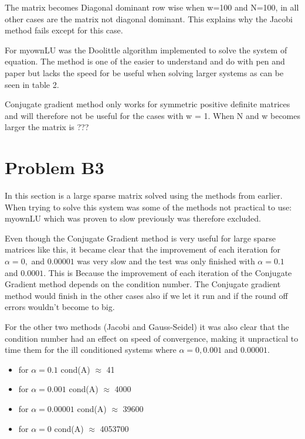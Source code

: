 \documentclass[a4paper]{article}
\begin{document}



The matrix becomes Diagonal dominant row wise when w=100 and N=100, in all other cases are the matrix not diagonal dominant. This explains why the Jacobi method fails except for this case.

For myownLU was the Doolittle algorithm implemented to solve the system of equation. The method is one of the easier to understand and do with pen and paper but lacks the speed for be useful when solving larger systems as can be seen in table 2.

Conjugate gradient method only works for symmetric positive definite matrices and will therefore not be useful for the cases with w = 1. When N and w becomes larger the matrix is ???


\section*{Problem B3}
In this section is a large sparse matrix solved using the methods from earlier. When trying to solve this system was some of the methods not practical to use: myownLU which was proven to slow previously was therefore excluded. 

Even though the Conjugate Gradient method is very useful for large sparse matrices like this, it became clear that the improvement of each iteration for  $\alpha = 0,$ and $0.00001$  was very slow and the test was only finished with $\alpha =0.1 $ and $0.0001$. This is Because the improvement of each iteration of the Conjugate Gradient method depends on the condition number. The Conjugate gradient method would finish in the other cases also if we let it run and if the round off errors wouldn’t become to big. 

For the other two methods (Jacobi and Gauss-Seidel) it was also clear that the condition number had an effect on speed of convergence, making it unpractical to time them for the ill conditioned systems where $\alpha = 0, 0.001$ and $0.00001$. 

\begin{itemize}
    \item for $\alpha = 0.1$  cond(A) $\approx $ 41
    \item for $\alpha = 0.001$  cond(A) $\approx $ 4000
    \item for $\alpha = 0.00001$  cond(A) $\approx $ 39600
    \item for $\alpha = 0$  cond(A) $\approx $ 4053700
\end{itemize}
\end{document}
